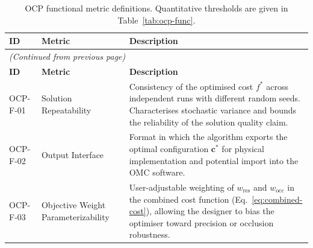 {\small\setlength{\tabcolsep}{4pt}
\begin{longtable}{p{1.5cm} >{\raggedright\arraybackslash}p{3.2cm} >{\raggedright\arraybackslash}p{\dimexpr\linewidth-1.5cm-3.2cm-6\tabcolsep\relax}}
\caption[OCP functional metric definitions.]{OCP functional metric definitions. Quantitative thresholds are given in Table~\ref{tab:ocp-func}.}
\label{tab:ocp-func-desc}\\
\toprule
\textbf{ID} & \textbf{Metric} & \textbf{Description} \\
\midrule
\endfirsthead
\multicolumn{3}{l}{\small\textit{(Continued from previous page)}}\\[2pt]
\toprule
\textbf{ID} & \textbf{Metric} & \textbf{Description} \\
\midrule
\endhead
\bottomrule
\endlastfoot
OCP-F-01 & Solution Repeatability & Consistency of the optimised cost $f^*$ across independent runs with different random seeds. Characterises stochastic variance and bounds the reliability of the solution quality claim. \\[4pt]
OCP-F-02 & Output Interface & Format in which the algorithm exports the optimal configuration $\mathbf{c}^*$ for physical implementation and potential import into the \gls{OMC} software. \\[4pt]
OCP-F-03 & Objective Weight Parameterizability & User-adjustable weighting of $w_{\text{res}}$ and $w_{\text{occ}}$ in the combined cost function (Eq.~\ref{eq:combined-cost}), allowing the designer to bias the optimiser toward precision or occlusion robustness. \\
\end{longtable}}

